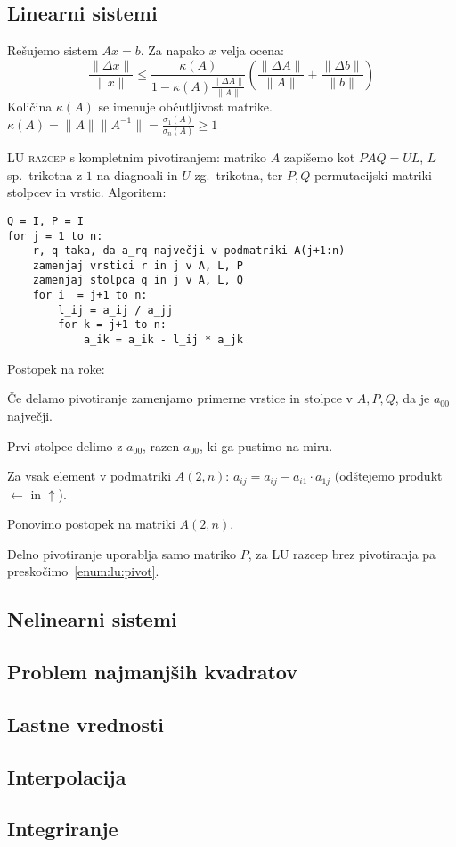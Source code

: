 \documentclass[a4paper,10pt]{article}
\theoremstyle{definition}
\newenvironment{enumerate*}%
{
\vspace{-6pt}
\begin{enumerate}
\setlength{\itemsep}{0pt}
\setlength{\parskip}{2pt}
}
{\end{enumerate}}
\begin{document}
\subsection*{Linearni sistemi}
Rešujemo sistem $Ax=b$. Za napako $x$ velja ocena:
\[ \frac{\|\Delta x\|}{\|x\|}  \leq \frac{\kappa(A)}{1-\kappa(A) \frac{\|\Delta
A\|}{\|A\|}} \left( \frac{\|\Delta A\|}{\|A\|} + \frac{\|\Delta
b\|}{\|b\|}\right) \]
Količina $\kappa(A)$ se imenuje občutljivost matrike. $\kappa(A) =
\|A\|\|A^{-1}\| = \frac{\sigma_1(A)}{\sigma_n(A)} \geq 1$

\textsc{LU razcep} s kompletnim pivotiranjem: matriko $A$ zapišemo kot $PAQ =
UL$, $L$ sp.\ trikotna z $1$ na diagnoali in $U$ zg.\ trikotna, ter $P, Q$
permutacijski matriki stolpcev in vrstic. Algoritem:
\begin{verbatim}
Q = I, P = I
for j = 1 to n:
    r, q taka, da a_rq največji v podmatriki A(j+1:n)
    zamenjaj vrstici r in j v A, L, P
    zamenjaj stolpca q in j v A, L, Q
    for i  = j+1 to n:
        l_ij = a_ij / a_jj
        for k = j+1 to n:
            a_ik = a_ik - l_ij * a_jk
\end{verbatim}

Postopek na roke:
\begin{enumerate*}
  \item * Če delamo pivotiranje zamenjamo primerne vrstice in stolpce v
    $A, P, Q$, da je $a_{00}$ največji. \label{enum:lu:pivot}
  \item Prvi stolpec delimo z $a_{00}$, razen $a_{00}$, ki ga pustimo na miru.
  \item Za vsak element v podmatriki $A(2, n)$: $a_{ij} = a_{ij} - a_{i1} \cdot
    a_{1j}$ (odštejemo produkt  $\leftarrow$ in $\uparrow$).
  \item Ponovimo postopek na matriki $A(2, n)$.
\end{enumerate*}

Delno pivotiranje uporablja samo matriko $P$, za LU razcep brez pivotiranja pa
preskočimo~\ref{enum:lu:pivot}.

\subsection*{Nelinearni sistemi}
\subsection*{Problem najmanjših kvadratov}
\subsection*{Lastne vrednosti}
\subsection*{Interpolacija}
\subsection*{Integriranje}
\end{document}
